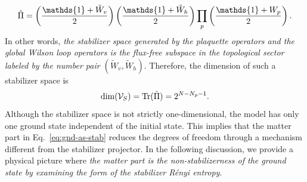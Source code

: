 \[
\hat{\Pi}
=
\lr{\frac{\mathds{1} + \tilde{W}_v}{2}} 
\lr{\frac{\mathds{1} + \tilde{W}_h}{2}}
\prod_{p} \lr{\frac{\mathds{1} + W_p}{2}}.
\]
In other words, \textit{the stabilizer space generated by the plaquette operators and the global Wilson loop operators is the flux-free subspace in the topological sector labeled by the number pair $(\tilde{W}_v, \tilde{W}_h)$}. Therefore, the dimension of such a stabilizer space is 
\[
\dim(\mathcal{V}_S) = \mathrm{Tr}(\hat{\Pi}) = 2^{N - N_p - 1}.
\]
Although the stabilizer space is not strictly one-dimensional, the model has only one ground state independent of the initial state. This implies that the matter part in Eq.~\eqref{eq:gnd-as-stab} reduces the degrees of freedom through a mechanism different from the stabilizer projector. In the following discussion, we provide a physical picture where \textit{the matter part is the non-stabilizerness of the ground state by examining the form of the stabilizer R\'enyi entropy}. 

